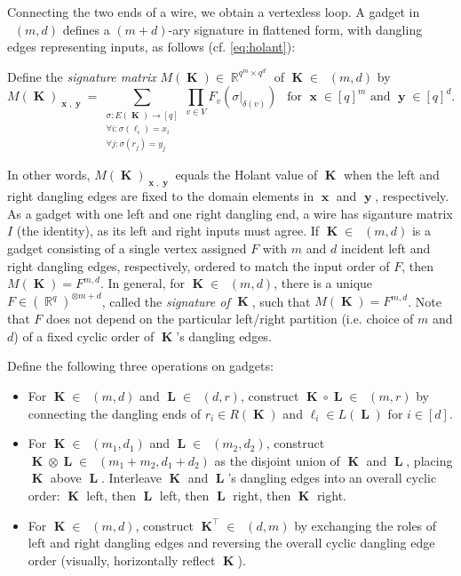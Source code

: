 \documentclass{article}
\DeclareMathOperator{\rr}{\mathbb{R}}
\DeclareMathOperator{\vk}{\mathbf{K}}
\DeclareMathOperator{\vl}{\mathbf{L}}
\DeclareMathOperator{\vx}{\mathbf{x}}
\DeclareMathOperator{\vy}{\mathbf{y}}
\DeclareMathOperator{\gk}{\mathfrak{G}_{\mathcal{F}}}
\begin{document}
Connecting the two ends of a wire, we obtain a vertexless loop.
A gadget in $\gk(m,d)$ defines a $(m+d)$-ary signature in flattened form, with dangling edges representing
inputs, as follows (cf. \eqref{eq:holant}):
\begin{definition}[$M(\vk)$]
    \label{def:gadget_sig_matrix}
    Define the \emph{signature matrix} $M(\vk) \in \rr^{q^m \times q^d}$ of $\vk \in \gk(m,d)$ by
    \[
        M(\vk)_{\vx,\vy} = \sum_{\substack{\sigma: E(\vk) \to [q]
        \\ \forall i: \sigma(\ell_i) = x_i 
        \\ \forall j: \sigma(r_j) = y_{j}}}
        \prod_{v \in V} F_v(\sigma|_{\delta(v)})
        ~~\text{ for $\vx \in [q]^m$ and $\vy \in [q]^d$}.
    \]
\end{definition}
In other words, $M(\vk)_{\vx,\vy}$ equals the Holant value of $\vk$ when the left and right dangling
edges are fixed to the domain elements in $\vx$ and $\vy$, respectively.
As a gadget with one left and one right dangling end, a wire
has siganture matrix $I$ (the identity), as its left and right inputs must agree.
If $\vk \in \gk(m,d)$ is a gadget consisting
of a single vertex assigned $F$ with $m$ and $d$ incident left and right dangling edges, 
respectively, ordered to match the input order of $F$, then $M(\vk) = F^{m,d}$.
In general, for $\vk \in \gk(m,d)$, there is a unique $F \in (\rr^q)^{\otimes m+d}$, called the \emph{signature of} $\vk$,
such that $M(\vk) = F^{m,d}$. Note that $F$ does not depend on the
particular left/right partition (i.e. choice of $m$ and $d$) of a fixed cyclic order 
of $\vk$'s dangling edges.
\begin{definition}[$\circ, \otimes, \top$]
    Define the following three operations on gadgets:
    \begin{itemize}
        \item For $\vk \in \gk(m,d)$ and $\vl \in \gk(d,r)$, construct $\vk \circ \vl \in \gk(m,r)$
            by connecting the dangling ends of $r_i \in R(\vk)$ and $\ell_i \in L(\vl)$ for $i \in [d]$.
        \item For $\vk \in \gk(m_1,d_1)$ and $\vl \in \gk(m_2,d_2)$, construct 
            $\vk \otimes \vl \in \gk(m_1+m_2,d_1+d_2)$ as the disjoint union of $\vk$ and $\vl$,
            placing $\vk$ above $\vl$. Interleave $\vk$ and $\vl$'s dangling edges into
            an overall cyclic order: $\vk$ left, then $\vl$ left, then $\vl$ right, then $\vk$ right.
        \item For $\vk \in \gk(m,d)$, construct $\vk^{\top} \in \gk(d,m)$ 
            by exchanging the roles of left and right dangling edges and reversing
            the overall cyclic dangling edge order (visually, horizontally reflect $\vk$).
    \end{itemize}
\end{definition}
\end{document}
